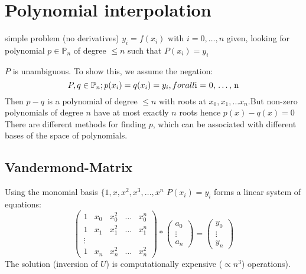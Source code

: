 \section{Polynomial interpolation}\label{sec:polynomial-interpolation}
simple problem (no derivatives) $y_i = f(x_i)$ with $i = 0, \ldots, n$ given,
looking for polynomial $p \in \mathbb{P}_n$ of degree $\leq n$ such that
$P(x_i) = y_i$

$P$ is unambiguous.
To show this, we assume the negation:
\begin{equation*}
    P, q \in \mathbb{P}_n; p(x_i)=q(x_i)=y_i, for all $i = 0, \ldots, n$
\end{equation*}
Then $p-q$ is a polynomial of degree $\leq n$ with roots at
$x_0, x_1, \ldots x_n$.But non-zero polynomials of degree $n$ have at most
exactly $n$ roots hence $p(x)-q(x) = 0$
There are different methods for finding $p$, which can be associated with different
bases of the space of polynomials.

\subsection{Vandermond-Matrix}\label{subsec:vandermond-matrix}
Using the monomial basis $\{ 1, x, x^2, x^3, \ldots, x^n$ $P(x_i) = y_i$ forms a
linear system of equations:
\begin{equation*}
    \begin{pmatrix*}
        1 &x_0 &x_0^2 &\ldots & x_0^n\\
        1 &x_1 &x_1^2 &\ldots & x_1^n\\
        \vdots \\
        1 & x_n & x_n^2&\ldots  &x_n^2
    \end{pmatrix*}
    *
    \begin{pmatrix*}
        a_0 \\
        \vdots\\
        a_n
    \end{pmatrix*}
    =
    \begin{pmatrix*}
        y_0\\
        \vdots\\
        y_n
    \end{pmatrix*}
\end{equation*}
The solution (inversion of $U$) is computationally expensive ($\propto n^3$) operations).

